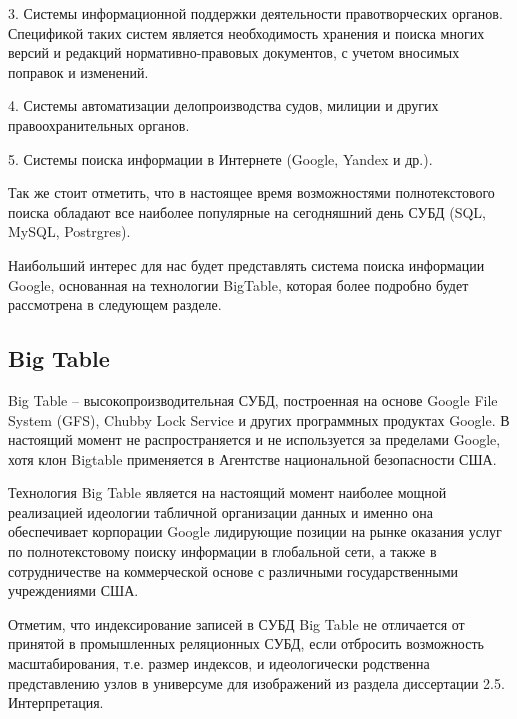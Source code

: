 3. Системы информационной поддержки деятельности правотворческих органов. Спецификой таких систем является необходимость хранения и поиска многих версий и редакций нормативно-правовых документов, с учетом вносимых поправок и изменений. 

4. Системы автоматизации делопроизводства судов, милиции и других правоохранительных органов.

5. Системы поиска информации в Интернете (Google, Yandex и др.).

Так же стоит отметить, что в настоящее время возможностями полнотекстового поиска обладают все наиболее популярные на сегодняшний день СУБД (SQL, MySQL, Postrgres).

Наибольший интерес для нас будет представлять система поиска информации Google, основанная на технологии BigTable, которая более подробно будет рассмотрена  в следующем разделе. 
\subsection{Big Table}
Big Table -- высокопроизводительная СУБД, построенная на основе Google File System (GFS), Chubby Lock Service и  других программных продуктах Google. В настоящий момент не распространяется и не используется за пределами Google, хотя клон Bigtable применяется в Агентстве национальной безопасности США.

Технология  Big Table  является на настоящий момент наиболее мощной реализацией идеологии табличной организации данных и именно она обеспечивает корпорации Google лидирующие позиции на рынке оказания услуг по полнотекстовому поиску информации в глобальной сети, а также в сотрудничестве на коммерческой основе с различными государственными учреждениями США.

Отметим, что индексирование записей в  СУБД  Big Table  не отличается от принятой в промышленных реляционных СУБД, если отбросить возможность масштабирования, т.е. размер индексов, и идеологически родственна представлению узлов в универсуме для изображений из раздела диссертации 2.5. Интерпретация. 

%


